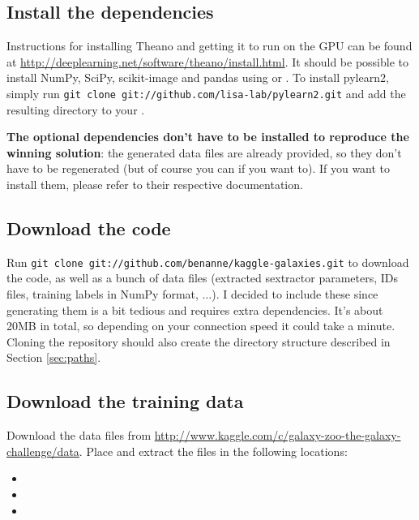 \documentclass[a4paper,10pt]{article}
\begin{document}
\subsection{Install the dependencies}

Instructions for installing Theano and getting it to run on the GPU can be found at \url{http://deeplearning.net/software/theano/install.html}. It should be possible to install NumPy, SciPy, scikit-image and pandas using  or . To install pylearn2, simply run \texttt{git clone git://github.com/lisa-lab/pylearn2.git} and add the resulting directory to your .

\textbf{The optional dependencies don't have to be installed to reproduce the winning solution}: the generated data files are already provided, so they don't have to be regenerated (but of course you can if you want to). If you want to install them, please refer to their respective documentation.

\subsection{Download the code}

Run \texttt{git clone git://github.com/benanne/kaggle-galaxies.git} to download the code, as well as a bunch of data files (extracted sextractor parameters, IDs files, training labels in NumPy format, ...). I decided to include these since generating them is a bit tedious and requires extra dependencies. It's about 20MB in total, so depending on your connection speed it could take a minute. Cloning the repository should also create the directory structure described in Section \ref{sec:paths}.

\subsection{Download the training data}

Download the data files from \url{http://www.kaggle.com/c/galaxy-zoo-the-galaxy-challenge/data}. Place and extract the files in the following locations:

\begin{itemize}
 \item {}
 \item {}
 \item {}
\end{itemize}
\end{document}
